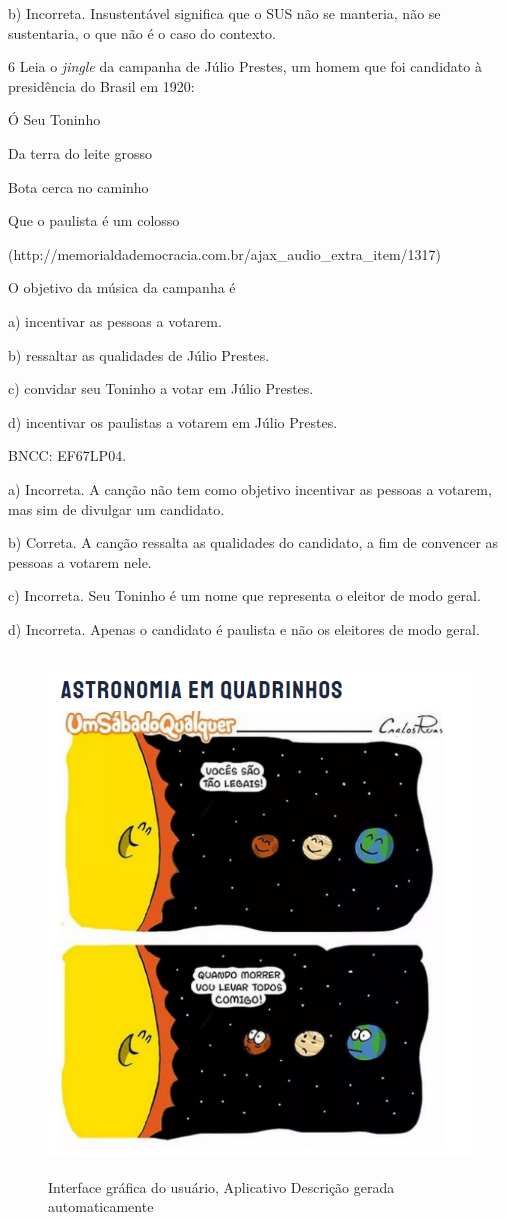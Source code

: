 {b) Incorreta. Insustentável significa que o SUS não se manteria, não se
sustentaria, o que não é o caso do contexto.

\num{6} Leia o \emph{jingle} da campanha de Júlio Prestes, um homem que
foi candidato à presidência do Brasil em 1920:

Ó Seu Toninho

Da terra do leite grosso

Bota cerca no caminho

Que o paulista é um colosso

(http://memorialdademocracia.com.br/ajax\_audio\_extra\_item/1317)

O objetivo da música da campanha é

a) incentivar as pessoas a votarem.

b) ressaltar as qualidades de Júlio Prestes.

c) convidar seu Toninho a votar em Júlio Prestes.

d) incentivar os paulistas a votarem em Júlio Prestes.

BNCC: EF67LP04.

a) Incorreta. A canção não tem como objetivo incentivar as pessoas a
votarem, mas sim de divulgar um candidato.

b) Correta. A canção ressalta as qualidades do candidato, a fim de
convencer as pessoas a votarem nele.

c) Incorreta. Seu Toninho é um nome que representa o eleitor de modo
geral.

d) Incorreta. Apenas o candidato é paulista e não os eleitores de modo
geral.

\begin{figure}
\centering
\includegraphics[width=4.75833in,height=5.41291in]{./imgSAEB_6_POR/media/image12.png}
\caption{Interface gráfica do usuário, Aplicativo Descrição gerada
automaticamente}
\end{figure}

}

